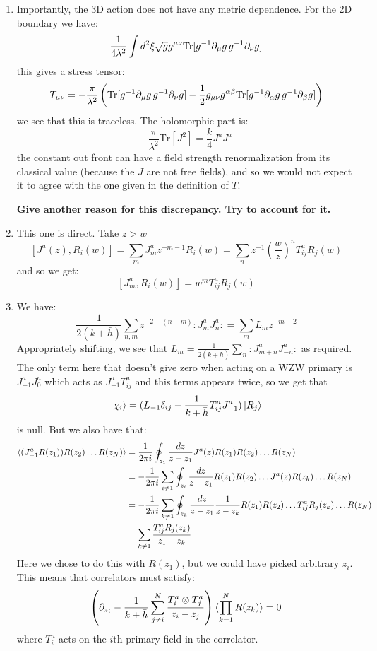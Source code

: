 \documentclass[11pt]{article}
\begin{document}
\begin{enumerate}
	\item Importantly, the 3D action does not have any metric dependence. For the 2D boundary we have:
	\[
		\frac{1}{4 \lambda^2} \int d^2 \xi \sqrt{g} g^{\mu \nu} \mathrm{Tr}[g^{-1}\partial_\mu g\, g^{-1} \partial_\nu g]
	\]
	this gives a stress tensor:
	\[
		T_{\mu \nu} = - \frac{\pi}{\lambda^2} \left(\mathrm{Tr}[g^{-1}\partial_\mu g\, g^{-1} \partial_\nu g] - \frac12 g_{\mu \nu} g^{\alpha \beta} \mathrm{Tr}[g^{-1}\partial_\alpha g\, g^{-1} \partial_\beta g] \right)
	\]
	we see that this is traceless. The holomorphic part is:
	\[
		- \frac{\pi}{\lambda^2} \mathrm{Tr}[J^2] = \frac{k}{4} J^a J^a
	\]
	the constant out front can have a field strength renormalization from its classical value (because the $J$ are not free fields), and so we would not expect it to agree with the one given in the definition of $T$.
	
	\textbf{Give another reason for this discrepancy. Try to account for it.}
	
	\item This one is direct. Take $z > w$
	\[
		[J^a(z), R_i(w)] = \sum_{m} J^a_m z^{-m-1} R_i (w) = \sum_{n} z^{-1} \left(\frac wz \right)^n T^a_{ij} R_j(w)
	\]
	and so we get:
	\[
		[J^a_m, R_i(w)] = w^m T^a_{ij} R_j(w)
	\]
	
	\item We have:
	\[
		\frac{1}{2(k+\bar h)} \sum_{n,m} z^{-2-(n+m)} :J^a_m J^a_n: = \sum_{m} L_m z^{-m-2}
	\]
	Appropriately shifting, we see that $L_m = \frac{1}{2(k+\bar h)} \sum_n :J^a_{m+n} J^a_{-n}:$ as required. The only term here that doesn't give zero when acting on a WZW primary is $J_{-1}^a J_0^a$ which acts as $J_{-1}^a T_{ij}^a$ and this terms appears twice, so we get that
	\[
		\ket{\chi_i} = (L_{-1} \delta_{ij} - \frac{1}{k + \bar h} T^a_{ij} J^a_{-1} ) \ket{R_j}
	\]
	is null. But we also have that:
	\[
	\begin{aligned}
		\braket{(J_{-1}^a R(z_1)) R(z_2) \dots R(z_N)} &= \frac{1}{2\pi i} \oint_{z_1} \frac{dz}{z-z_1} J^a(z) R(z_1) R(z_2) \dots R(z_N)\\
		&=  - \frac{1}{2\pi i} \sum_{i \neq 1} \oint_{z_i} \frac{dz}{z-z_1} R(z_1) R(z_2)\dots J^a(z) R(z_k) \dots R(z_N)\\
		&= - \frac{1}{2\pi i} \sum_{k \neq 1} \oint_{z_k} \frac{dz}{z-z_1} \frac{1}{z-z_k} R(z_1) R(z_2)\dots T^a_{ij} R_{j}(z_k) \dots R(z_N)\\
		&= \sum_{k \neq 1} \frac{T^a_{ij} R_j(z_k)}{z_1 - z_k}
	\end{aligned}
	\]
	Here we chose to do this with $R(z_1)$, but we could have picked arbitrary $z_i$. This means that correlators must satisfy:
	\[
		\left(\partial_{z_i} -   \frac{1}{k + \bar h} \sum_{j \neq i}^N \frac{T^a_i \otimes T^a_j}{z_i - z_j} \right) \braket{\prod_{k=1}^N R(z_k)} = 0
	\]
	where $T^a_i$ acts on the $i$th primary field in the correlator. 
	

\end{enumerate}
\end{document}
